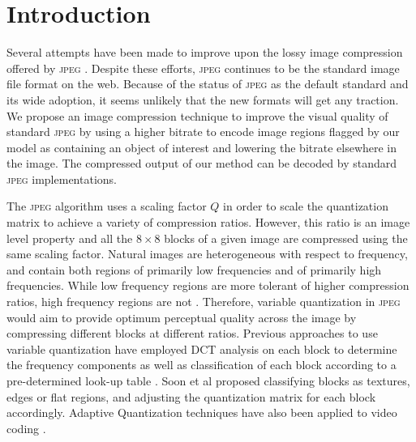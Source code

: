\section{Introduction}
Several attempts have been made to improve upon the lossy image compression offered by \textsc{jpeg} \cite{xxx_ginesu2012objective} \cite{xxx_toderici2016full}.
Despite these efforts, \textsc{jpeg} continues to be the standard image file format on the web.
Because of the status of \textsc{jpeg} as the default standard and its wide adoption, it seems unlikely that the new formats will get any traction.
We propose an image compression technique to improve the visual quality of standard \textsc{jpeg} by using a higher bitrate to encode image regions flagged by our model as containing an object of interest and lowering the bitrate elsewhere in the image.
The compressed output of our method can be decoded by standard \textsc{jpeg} implementations.

The \textsc{jpeg} algorithm uses a scaling factor $Q$ in order to scale the quantization matrix to achieve a variety of compression ratios.
However, this ratio is an image level property and all the $8 \times 8$ blocks of a given image are compressed using the same scaling factor.
Natural images are heterogeneous with respect to frequency, and contain both regions of primarily low frequencies and of primarily high frequencies.
While low frequency regions are more tolerant of higher compression ratios, high frequency regions are not \cite{xxx_chandra1999jpegcompressionme}.
Therefore, variable quantization in \textsc{jpeg} would aim to provide optimum perceptual quality across the image by compressing different blocks at different ratios.
Previous approaches to use variable quantization have employed DCT analysis on each block to determine the frequency components \cite{xxx_konstantinides1998method} as well as classification of each block according to a pre-determined look-up table \cite{xxx_memon2000method}.
Soon et al \cite{xxx_tan1996classified} proposed classifying blocks as textures, edges or flat regions, and adjusting the quantization matrix for each block accordingly.
Adaptive Quantization techniques have also been applied to video coding \cite{xxx_xiang2014adaptive}.

